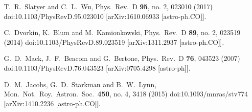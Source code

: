   T.~R.~Slatyer and C.~L.~Wu,
  Phys.\ Rev.\ D {\bf 95}, no. 2, 023010 (2017)
  doi:10.1103/PhysRevD.95.023010
  [arXiv:1610.06933 [astro-ph.CO]].
  
  C.~Dvorkin, K.~Blum and M.~Kamionkowski,
  Phys.\ Rev.\ D {\bf 89}, no. 2, 023519 (2014)
  doi:10.1103/PhysRevD.89.023519
  [arXiv:1311.2937 [astro-ph.CO]].
  
  G.~D.~Mack, J.~F.~Beacom and G.~Bertone,
  Phys.\ Rev.\ D {\bf 76}, 043523 (2007)
  doi:10.1103/PhysRevD.76.043523
  [arXiv:0705.4298 [astro-ph]].

  D.~M.~Jacobs, G.~D.~Starkman and B.~W.~Lynn,
  Mon.\ Not.\ Roy.\ Astron.\ Soc.\  {\bf 450}, no. 4, 3418 (2015)
  doi:10.1093/mnras/stv774
  [arXiv:1410.2236 [astro-ph.CO]].

